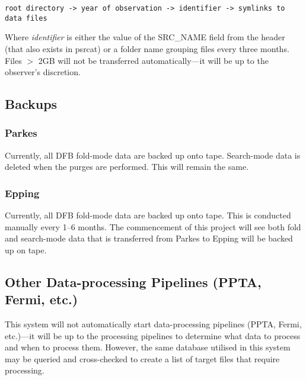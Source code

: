 \documentclass{article}
\begin{document}
\begin{verbatim}
root directory -> year of observation -> identifier -> symlinks to data files
\end{verbatim}

Where \emph{identifier} is either the value of the SRC\_NAME field from the header (that also exists in psrcat) or a folder name grouping files every three months. Files $>$ 2GB will not be transferred automatically---it will be up to the observer's discretion.

\subsection{Backups}
\subsubsection{Parkes}
Currently, all DFB fold-mode data are backed up onto tape. Search-mode data is deleted when the purges are performed. This will remain the same.

\subsubsection{Epping}
Currently, all DFB fold-mode data are backed up onto tape. This is conducted manually every 1--6 months. The commencement of this project will see both fold and search-mode data that is transferred from Parkes to Epping will be backed up on tape.

\subsection{Other Data-processing Pipelines (PPTA, Fermi, etc.)}
This system will not automatically start data-processing pipelines (PPTA, Fermi, etc.)---it will be up to the processing pipelines to determine what data to process and when to process them. However, the same database utilised in this system may be queried and cross-checked to create a list of target files that require processing.
\end{document}
